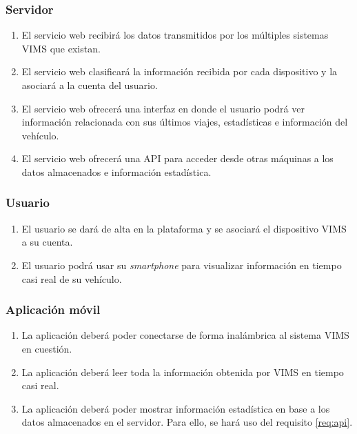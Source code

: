 \subsubsection{Servidor}
\begin{enumerate}[resume, label=\textbf{\texttt{RF-\arabic*}}]
  \item\label{req:reception} El servicio web recibirá los datos transmitidos por los
        múltiples sistemas \ac{VIMS} que existan.
  \item\label{req:management} El servicio web clasificará la información recibida
        por cada dispositivo y la asociará a la cuenta del usuario.
  \item\label{req:visualization} El servicio web ofrecerá una interfaz en donde
        el usuario podrá ver información relacionada con sus últimos viajes,
        estadísticas e información del vehículo.
  \item\label{req:api} El servicio web ofrecerá una \ac{API} para acceder
        desde otras máquinas a los datos almacenados e
        información estadística.
\end{enumerate}

\subsubsection{Usuario}
\begin{enumerate}[resume, label=\textbf{\texttt{RF-\arabic*}}]
  \item\label{req:register} El usuario se dará de alta en la plataforma y se
        asociará el dispositivo \ac{VIMS} a su cuenta.
  \item\label{req:rt} El usuario podrá usar su \textit{smartphone} para visualizar
        información en tiempo casi real de su vehículo.
\end{enumerate}

\subsubsection{Aplicación móvil}
\begin{enumerate}[resume, label=\textbf{\texttt{RF-\arabic*}}]
  \item\label{req:app-functions} La aplicación deberá poder conectarse de forma
        inalámbrica al sistema \ac{VIMS} en cuestión.
  \item\label{req:app-sampling} La aplicación deberá leer toda la información
        obtenida por \ac{VIMS} en tiempo casi real.
  \item\label{req:app-stats} La aplicación deberá poder mostrar información
        estadística en base a los datos almacenados en el servidor. Para ello,
        se hará uso del requisito \ref{req:api}.
\end{enumerate}